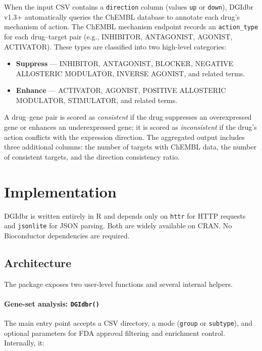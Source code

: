\documentclass[11pt,a4paper]{article}
\begin{document}
When the input CSV contains a \texttt{direction} column (values \texttt{up} or \texttt{down}), DGIdbr v1.3+ automatically queries the ChEMBL database to annotate each drug's mechanism of action. The ChEMBL mechanism endpoint records an \texttt{action\_type} for each drug--target pair (e.g., INHIBITOR, ANTAGONIST, AGONIST, ACTIVATOR). These types are classified into two high-level categories:

\begin{itemize}[noitemsep]
  \item \textbf{Suppress} --- INHIBITOR, ANTAGONIST, BLOCKER, NEGATIVE ALLOSTERIC MODULATOR, INVERSE AGONIST, and related terms.
  \item \textbf{Enhance} --- ACTIVATOR, AGONIST, POSITIVE ALLOSTERIC MODULATOR, STIMULATOR, and related terms.
\end{itemize}

A drug--gene pair is scored as \emph{consistent} if the drug suppresses an overexpressed gene or enhances an underexpressed gene; it is scored as \emph{inconsistent} if the drug's action conflicts with the expression direction. The aggregated output includes three additional columns: the number of targets with ChEMBL data, the number of consistent targets, and the direction consistency ratio.

\section{Implementation}

DGIdbr is written entirely in R and depends only on \texttt{httr} for HTTP requests and \texttt{jsonlite} for JSON parsing. Both are widely available on CRAN. No Bioconductor dependencies are required.

\subsection{Architecture}

The package exposes two user-level functions and several internal helpers.

\paragraph{Gene-set analysis: \texttt{DGIdbr()}} The main entry point accepts a CSV directory, a mode (\texttt{group} or \texttt{subtype}), and optional parameters for FDA approval filtering and enrichment control. Internally, it:
\end{document}
